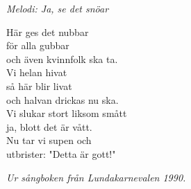 {\footnotesize\textit{Melodi: Ja, se det snöar}}\par
\vspace{10pt}
Här ges det nubbar\\
för alla gubbar\\
och även kvinnfolk ska ta.\\
Vi helan hivat\\
så här blir livat\\
och halvan drickas nu ska.\\
Vi slukar stort liksom smått\\
ja, blott det är vått.\\
Nu tar vi supen och\\
utbrister: "Detta är gott!"
\par
\vspace{10pt}
{\footnotesize\textit{Ur sångboken från Lundakarnevalen 1990.}}
